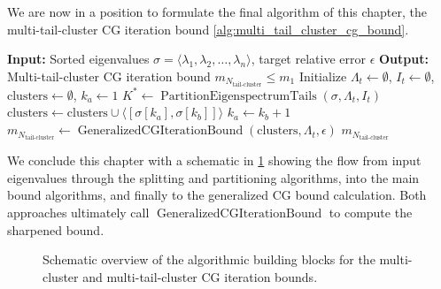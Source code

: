 We are now in a position to formulate the final algorithm of this chapter, the multi-tail-cluster CG iteration bound \cref{alg:multi_tail_cluster_cg_bound}.
\begin{algorithm}[H]
    \caption{$\operatorname{MultiTailClusterCGIterationBound}(\sigma, \epsilon)$}
    \begin{algorithmic}[1]
        \State \textbf{Input:} Sorted eigenvalues $\sigma = \langle\lambda_1, \lambda_2, \ldots, \lambda_n\rangle$, target relative error $\epsilon$
        \State \textbf{Output:} Multi-tail-cluster CG iteration bound $m_{N_{\text{tail-cluster}}} \leq m_1$
        \State Initialize $\Lambda_t \gets \emptyset$, $I_t\gets\emptyset$, $\text{clusters} \gets \emptyset$, $k_a\gets 1$
        \State $K^* \gets \operatorname{PartitionEigenspectrumTails}(\sigma, \Lambda_t, I_t)$
         
            \State $\text{clusters} \gets \text{clusters} \cup \langle[\sigma[k_a], \sigma[k_b]]\rangle$
        \EndIf
        \State $k_a \gets k_b + 1$
        \EndFor
        \State $m_{N_{\text{tail-cluster}}} \gets \operatorname{GeneralizedCGIterationBound}(\text{clusters}, \Lambda_t, \epsilon)$
        \State \Return $m_{N_{\text{tail-cluster}}}$
    \end{algorithmic}
    \label{alg:multi_tail_cluster_cg_bound}
\end{algorithm}

We conclude this chapter with a schematic in \cref{fig:cg_bound_flow} showing the flow from input eigenvalues through the splitting and partitioning algorithms, into the main bound algorithms, and finally to the generalized CG bound calculation. Both approaches ultimately call $\operatorname{GeneralizedCGIterationBound}$ to compute the sharpened bound.
\begin{figure}[H]
    \centering
    
    \caption{Schematic overview of the algorithmic building blocks for the multi-cluster and multi-tail-cluster CG iteration bounds.}
    \label{fig:cg_bound_flow}
\end{figure}